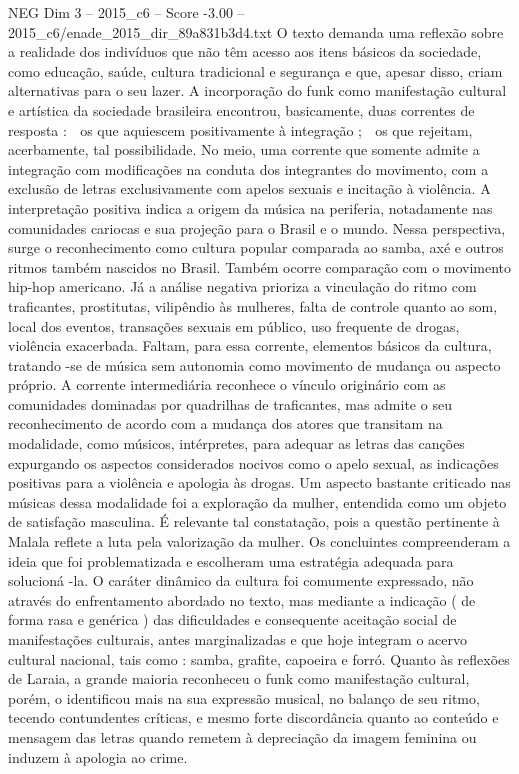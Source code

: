 \begin{textsample}{NEG Dim 3 – 2015\_c6 – Score -3.00 – 2015\_c6/enade\_2015\_dir\_89a831b3d4.txt}
O texto demanda uma reflexão sobre a realidade dos indivíduos que não têm acesso aos itens básicos da sociedade, como educação, saúde, cultura tradicional e segurança e que, apesar disso, criam alternativas para o seu lazer.
A incorporação do funk como manifestação cultural e artística da sociedade brasileira encontrou, basicamente, duas correntes de resposta :  os que aquiescem positivamente à integração ;  os que rejeitam, acerbamente, tal possibilidade.
No meio, uma corrente que somente admite a integração com modificações na conduta dos integrantes do movimento, com a exclusão de letras exclusivamente com apelos sexuais e incitação à violência.
A interpretação positiva indica a origem da música na periferia, notadamente nas comunidades cariocas e sua projeção para o Brasil e o mundo.
Nessa perspectiva, surge o reconhecimento como cultura popular comparada ao samba, axé e outros ritmos também nascidos no Brasil.
Também ocorre comparação com o movimento hip-hop americano.
Já a análise negativa prioriza a vinculação do ritmo com traficantes, prostitutas, vilipêndio às mulheres, falta de controle quanto ao som, local dos eventos, transações sexuais em público, uso frequente de drogas, violência exacerbada.
Faltam, para essa corrente, elementos básicos da cultura, tratando -se de música sem autonomia como movimento de mudança ou aspecto próprio.
A corrente intermediária reconhece o vínculo originário com as comunidades dominadas por quadrilhas de traficantes, mas admite o seu reconhecimento de acordo com a mudança dos atores que transitam na modalidade, como músicos, intérpretes, para adequar as letras das canções expurgando os aspectos considerados nocivos como o apelo sexual, as indicações positivas para a violência e apologia às drogas.
Um aspecto bastante criticado nas músicas dessa modalidade foi a exploração da mulher, entendida como um objeto de satisfação masculina.
É relevante tal constatação, pois a questão pertinente à Malala reflete a luta pela valorização da mulher.
Os concluintes compreenderam a ideia que foi problematizada e escolheram uma estratégia adequada para solucioná -la.
O caráter dinâmico da cultura foi comumente expressado, não através do enfrentamento abordado no texto, mas mediante a indicação ( de forma rasa e genérica ) das dificuldades e consequente aceitação social de manifestações culturais, antes marginalizadas e que hoje integram o acervo cultural nacional, tais como : samba, grafite, capoeira e forró.
Quanto às reflexões de Laraia, a grande maioria reconheceu o funk como manifestação cultural, porém, o identificou mais na sua expressão musical, no balanço de seu ritmo, tecendo contundentes críticas, e mesmo forte discordância quanto ao conteúdo e mensagem das letras quando remetem à depreciação da imagem feminina ou induzem à apologia ao crime.

\end{textsample}
